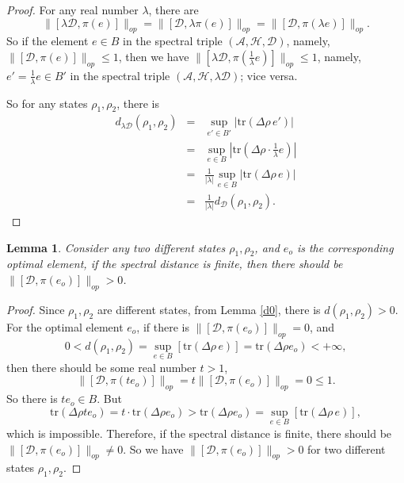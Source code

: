 \documentclass[a4paper,12pt]{article}
\newtheorem{lemma}{Lemma}
\begin{document}
\begin{proof}
For any real number $\lambda$, there are
\begin{equation}
  \|[\lambda \mathcal{D}, \pi (e)]\|_{op} = \|[\mathcal{D}, \lambda \pi
  (e)]\|_{op} = \|[\mathcal{D}, \pi (\lambda e)]\|_{op} .
\end{equation}
So if the element $e \in B$ in the spectral triple $(\mathcal{A}, \mathcal{H},
\mathcal{D})$, namely, $\|[\mathcal{D}, \pi (e)]\|_{op} \leqslant 1$, then we
have $\|[\lambda \mathcal{D}, \pi \left( \frac{1}{\lambda} e \right)]\|_{op}
\leqslant 1$, namely, $e' = \frac{1}{\lambda} e \in B'$ in the spectral triple
$(\mathcal{A}, \mathcal{H}, \lambda \mathcal{D})$; vice versa.

So for any states $\rho_1, \rho_2$, there is
\begin{eqnarray}
  d_{\lambda \mathcal{D}} (\rho_1, \rho_2) & = & \sup_{e' \in B'} |
  \mathrm{tr} (\Delta \rho \, e') | \nonumber\\
  & = & \sup_{e \in B} | \mathrm{tr} (\Delta \rho \cdot \frac{1}{\lambda} e)
  | \nonumber\\
  & = & \frac{1}{| \lambda |} \sup_{e \in B} | \mathrm{tr} (\Delta \rho
  \, e) | \nonumber\\
  & = & \frac{1}{| \lambda |} d_{\mathcal{D}} (\rho_1, \rho_2) . 
\end{eqnarray}
\end{proof}

\begin{lemma}\cite{Martinettip}
  Consider any two different states $\rho_1, \rho_2$, and $e_o$ is the
  corresponding optimal element, if the spectral distance is finite, then
  there should be $\|[\mathcal{D}, \pi (e_o)]\|_{op} > 0$.
\end{lemma}

\begin{proof}
Since $\rho_1, \rho_2$ are different states, from Lemma \ref{d0}, there is
$d (\rho_1, \rho_2) > 0$. For the optimal element $e_o$, if there is
$\|[\mathcal{D}, \pi (e_o)]\|_{op} = 0$, and
\begin{equation}
  0 < d (\rho_1, \rho_2) = \sup_{e \in B} [\mathrm{tr} (\Delta \rho
  \, e)] = \mathrm{tr} (\Delta \rho e_o) < + \infty,
\end{equation}
then there should be some real number $t > 1$,
\begin{equation}
  \|[\mathcal{D}, \pi (te_o)]\|_{op} = t \|[\mathcal{D}, \pi (e_o)]\|_{op} = 0
  \leqslant 1.
\end{equation}
So there is $te_o \in B$. But
\begin{equation}
  \mathrm{tr} (\Delta \rho te_o) = t \cdot \mathrm{tr} (\Delta \rho e_o) >
  \mathrm{tr} (\Delta \rho e_o) = \sup_{e \in B} [\mathrm{tr} (\Delta \rho
  \, e)],
\end{equation}
which is impossible. Therefore, if the spectral distance is finite, there should be
$\|[\mathcal{D}, \pi (e_o)]\|_{op} \neq 0$. So we have
$\|[\mathcal{D}, \pi (e_o)]\|_{op} > 0$ for two different states $\rho_1, \rho_2$.
\end{proof}
\end{document}
